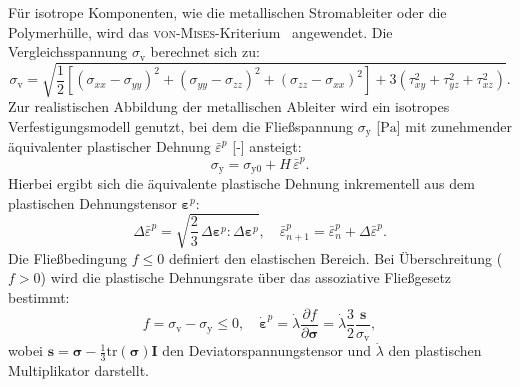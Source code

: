 Für isotrope Komponenten, wie die metallischen Stromableiter oder die Polymerhülle, wird das \textsc{von-Mises}-Kriterium~\cite{Hill1998} angewendet. Die Vergleichsspannung $\sigma_\mathrm{v}$ berechnet sich zu:
\begin{equation}
\sigma_\mathrm{v} = \sqrt{\frac{1}{2}
\left [
(\sigma_{xx}-\sigma_{yy})^2 +
(\sigma_{yy}-\sigma_{zz})^2 +
(\sigma_{zz}-\sigma_{xx})^2
\right ]
+ 3\left ( \tau_{xy}^2 + \tau_{yz}^2 + \tau_{xz}^2 \right )}.
\end{equation}
Zur realistischen Abbildung der metallischen Ableiter wird ein isotropes Verfestigungsmodell genutzt, bei dem die Fließspannung $\sigma_\mathrm{y}$ [$\si{\pascal}$] mit zunehmender äquivalenter plastischer Dehnung $\bar{\varepsilon}^p$ [-] ansteigt:
\begin{equation}
\sigma_\mathrm{y} = \sigma_{\mathrm{y}0} + H \, \bar{\varepsilon}^p .
\end{equation}
Hierbei ergibt sich die äquivalente plastische Dehnung inkrementell aus dem plastischen Dehnungstensor $\boldsymbol{\varepsilon}^p$:
\begin{equation}
\Delta \bar{\varepsilon}^p = \sqrt{\frac{2}{3} \, \Delta \boldsymbol{\varepsilon}^p : \Delta \boldsymbol{\varepsilon}^p}, \quad \bar{\varepsilon}^{p}_{n+1} = \bar{\varepsilon}^{p}_{n} + \Delta \bar{\varepsilon}^{p}.
\end{equation}
Die Fließbedingung $f \le 0$ definiert den elastischen Bereich. Bei Überschreitung ($f > 0$) wird die plastische Dehnungsrate über das assoziative Fließgesetz bestimmt:
\begin{equation}
f = \sigma_\mathrm{v} - \sigma_\mathrm{y} \le 0, \quad \dot{\boldsymbol{\varepsilon}}^p = \dot{\lambda} \frac{\partial f}{\partial \boldsymbol{\sigma}} = \dot{\lambda} \frac{3}{2} \frac{\boldsymbol{s}}{\sigma_\mathrm{v}},
\end{equation}
wobei $\boldsymbol{s} = \boldsymbol{\sigma} - \frac{1}{3}\text{tr}(\boldsymbol{\sigma}) \boldsymbol{I}$ den Deviatorspannungstensor und $\dot{\lambda}$ den plastischen Multiplikator darstellt.

